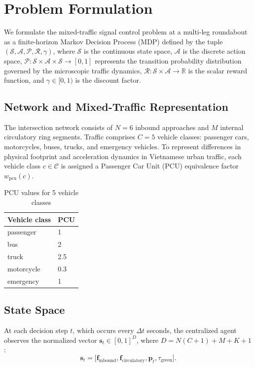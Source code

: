 \section{Problem Formulation}\label{s:3}
We formulate the mixed-traffic signal control problem at a multi-leg roundabout as a finite-horizon Markov Decision Process (MDP) defined by the tuple $(\mathcal{S}, \mathcal{A}, \mathcal{P}, \mathcal{R}, \gamma)$, where $\mathcal{S}$ is the continuous state space, $\mathcal{A}$ is the discrete action space, $\mathcal{P}: \mathcal{S} \times \mathcal{A} \times \mathcal{S} \rightarrow [0, 1]$ represents the transition probability distribution governed by the microscopic traffic dynamics, $\mathcal{R}: \mathcal{S} \times \mathcal{A} \rightarrow \mathbb{R}$ is the scalar reward function, and $\gamma \in [0, 1)$ is the discount factor.

\subsection{Network and Mixed-Traffic Representation}
The intersection network consists of $N=6$ inbound approaches and $M$ internal circulatory ring segments. Traffic comprises $C = 5$ vehicle classes: passenger cars, motorcycles, buses, trucks, and emergency vehicles. To represent differences in physical footprint and acceleration dynamics in Vietnamese urban traffic, each vehicle class $c \in \mathcal{C}$ is assigned a Passenger Car Unit (PCU) equivalence factor $w_{\text{pcu}}(c)$.

\begin{table}[htbp]
\caption{PCU values for 5 vehicle classes}
\centering
\begin{tabular}{ll}
\toprule
Vehicle class & PCU  \\
\midrule
passenger     & 1    \\
bus           & 2    \\
truck         & 2.5  \\
motorcycle    & 0.3  \\
emergency     & 1    \\
\bottomrule
\end{tabular}
\end{table}

\subsection{State Space}
At each decision step $t$, which occurs every $\Delta t$ seconds, the centralized agent observes the normalized vector $\mathbf{s}_t \in [0,1]^D$, where $D=N(C+1)+M+K+1$:
\begin{equation*}
\mathbf{s}_t = \big[\mathbf{f}_{\text{inbound}},\mathbf{f}_{\text{circulatory}},\mathbf{p}_t,\tau_{\text{green}}\big].
\end{equation*}

